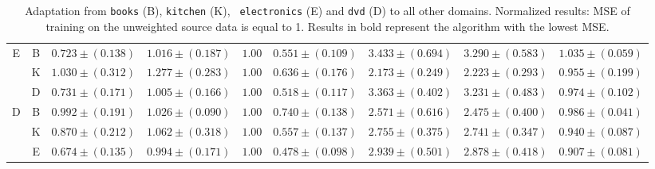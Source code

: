 \documentclass[twoside,11pt]{article}
\newcommand{\1}{\mat{1}}
\begin{document}
\begin{table}[t]
\begin{center}
\begin{tabular}{ccccccccc}
\hline
 \multirow{3}{*}{ \tiny{E}} & \tiny{B} & $\mathbf{\scriptscriptstyle{
     0.723   \pm ( 0.138 )}}$ & $\scriptscriptstyle{ 1.016   \pm ( 0.187 )}$
 & $\scriptscriptstyle{1.00}$& $\scriptscriptstyle{ 0.551   \pm ( 0.109 )}$ & $\scriptscriptstyle{ 3.433   \pm ( 0.694 )}$ & $\scriptscriptstyle{ 3.290   \pm ( 0.583 )}$ & $\scriptscriptstyle{ 1.035   \pm ( 0.059 )}$\\
& \tiny{K} & $\scriptscriptstyle{ 1.030   \pm ( 0.312 )}$ & $\scriptscriptstyle{
  1.277   \pm ( 0.283 )}$ & $\scriptscriptstyle{1.00}$& $\scriptscriptstyle{ 0.636   \pm ( 0.176 )}$ & $\scriptscriptstyle{ 2.173   \pm ( 0.249 )}$ & $\scriptscriptstyle{ 2.223   \pm ( 0.293 )}$ & $\mathbf{\scriptscriptstyle{ 0.955   \pm ( 0.199 )}}$\\
& \tiny{D} & $\mathbf{\scriptscriptstyle{ 0.731   \pm ( 0.171 )}}$ &
$\scriptscriptstyle{ 1.005   \pm ( 0.166 )}$ & $\scriptscriptstyle{1.00}$& $\scriptscriptstyle{ 0.518   \pm ( 0.117 )}$ & $\scriptscriptstyle{ 3.363   \pm ( 0.402 )}$ & $\scriptscriptstyle{ 3.231   \pm ( 0.483 )}$ & $\scriptscriptstyle{ 0.974   \pm ( 0.102 )}$\\
\hline
 \multirow{3}{*}{ \tiny{D}} & \tiny{B} & $\scriptscriptstyle{ 0.992   \pm
   ( 0.191 )}$ & $\scriptscriptstyle{ 1.026   \pm ( 0.090 )}$ &
 $\scriptscriptstyle{1.00}$& $\scriptscriptstyle{ 0.740   \pm ( 0.138 )}$ & $\scriptscriptstyle{ 2.571   \pm ( 0.616 )}$ & $\scriptscriptstyle{ 2.475   \pm ( 0.400 )}$ & $\mathbf{\scriptscriptstyle{ 0.986   \pm ( 0.041 )}}$\\
& \tiny{K} & $\mathbf{\scriptscriptstyle{ 0.870   \pm ( 0.212 )}}$ &
$\scriptscriptstyle{ 1.062   \pm ( 0.318 )}$ & $\scriptscriptstyle{1.00}$& $\scriptscriptstyle{ 0.557   \pm ( 0.137 )}$ & $\scriptscriptstyle{ 2.755   \pm ( 0.375 )}$ & $\scriptscriptstyle{ 2.741   \pm ( 0.347 )}$ & $\scriptscriptstyle{ 0.940   \pm ( 0.087 )}$\\
& \tiny{E} & $\mathbf{\scriptscriptstyle{ 0.674   \pm ( 0.135 )}}$ &
$\scriptscriptstyle{ 0.994   \pm ( 0.171 )}$ & $\scriptscriptstyle{1.00}$& $\scriptscriptstyle{ 0.478   \pm ( 0.098 )}$ & $\scriptscriptstyle{ 2.939   \pm ( 0.501 )}$ & $\scriptscriptstyle{ 2.878   \pm ( 0.418 )}$ & $\scriptscriptstyle{ 0.907   \pm ( 0.081 )}$\\
\hline
 \end{tabular}
\caption{ Adaptation from {\tt books} (B), {\tt kitchen} (K), {\tt
electronics} (E) and {\tt dvd} (D) to all other domains. Normalized
results: MSE of training on the unweighted source data is equal to
1. Results in bold represent the algorithm with the lowest MSE.}
\label{table:sent}
\end{center}
\end{table}
\end{document}
